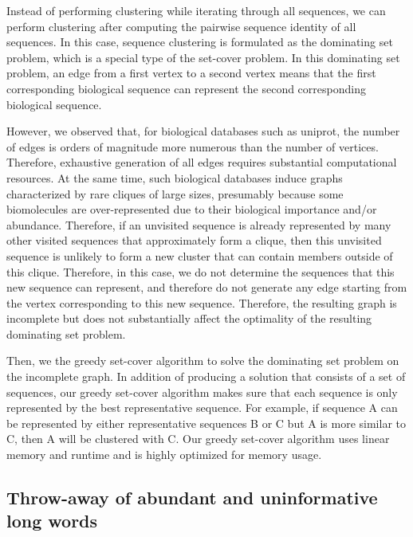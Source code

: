 \documentclass[]{article}
\begin{document}
Instead of performing clustering while iterating through all sequences, we can perform clustering after computing the pairwise sequence identity of all sequences. 
In this case, sequence clustering is formulated as the dominating set problem, which is a special type of the set-cover problem. 
In this dominating set problem, an edge from a first vertex to a second vertex means that the first corresponding biological sequence can represent the second corresponding biological sequence. 

However, we observed that, for biological databases such as uniprot, the number of edges is orders of magnitude more numerous than the number of vertices. Therefore, exhaustive generation of all edges requires substantial computational resources.
At the same time, such biological databases induce graphs characterized by rare cliques of large sizes, presumably because some biomolecules are over-represented due to their biological importance and/or abundance.
Therefore, if an unvisited sequence is already represented by many other visited sequences that approximately form a clique, then this unvisited sequence is unlikely to form a new cluster that can contain members outside of this clique. 
Therefore, in this case, we do not determine the sequences that this new sequence can represent, and therefore do not generate any edge starting from the vertex corresponding to this new sequence. 
Therefore, the resulting graph is incomplete but does not substantially affect the optimality of the resulting dominating set problem.

Then, we the greedy set-cover algorithm to solve the dominating set problem on the incomplete graph.
In addition of producing a solution that consists of a set of sequences, 
	our greedy set-cover algorithm makes sure that each sequence is only represented by the best representative sequence.
For example, if sequence A can be represented by either representative sequences B or C but A is more similar to C,
	then A will be clustered with C.  
Our greedy set-cover algorithm uses linear memory and runtime and is highly optimized for memory usage.



\subsection{Throw-away of abundant and uninformative long words}
\end{document}
